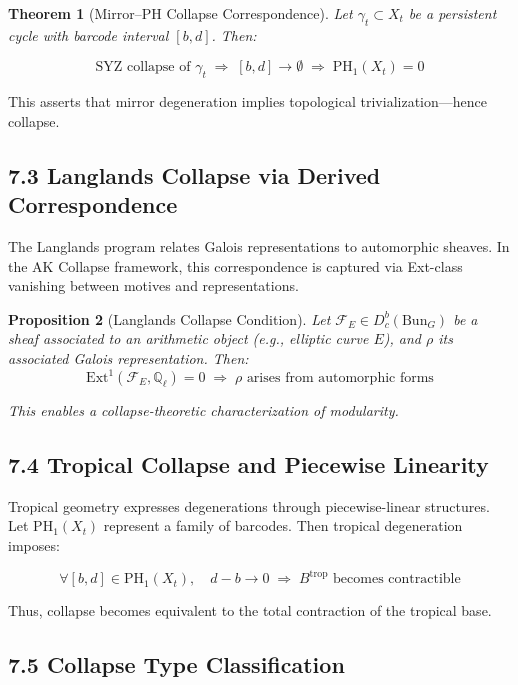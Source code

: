 \documentclass[11pt]{article}
\newtheorem{theorem}{Theorem}[section]
\newtheorem{proposition}[theorem]{Proposition}
\begin{document}
\begin{theorem}[Mirror–PH Collapse Correspondence]
Let \( \gamma_t \subset X_t \) be a persistent cycle with barcode interval \( [b, d] \). Then:

\[
\text{SYZ collapse of } \gamma_t \;\Longrightarrow\; [b,d] \to \emptyset \;\Longrightarrow\; \mathrm{PH}_1(X_t) = 0
\]
\end{theorem}

This asserts that mirror degeneration implies topological trivialization—hence collapse.

\subsection*{7.3 Langlands Collapse via Derived Correspondence}

The Langlands program relates Galois representations to automorphic sheaves.  
In the AK Collapse framework, this correspondence is captured via Ext-class vanishing between motives and representations.

\begin{proposition}[Langlands Collapse Condition]
Let \( \mathcal{F}_E \in D^b_c(\mathrm{Bun}_G) \) be a sheaf associated to an arithmetic object (e.g., elliptic curve \( E \)), and \( \rho \) its associated Galois representation.  
Then:
\[
\mathrm{Ext}^1(\mathcal{F}_E, \mathbb{Q}_\ell) = 0 \;\Longrightarrow\; \rho \text{ arises from automorphic forms}
\]

This enables a collapse-theoretic characterization of modularity.
\end{proposition}

\subsection*{7.4 Tropical Collapse and Piecewise Linearity}

Tropical geometry expresses degenerations through piecewise-linear structures.  
Let \( \mathrm{PH}_1(X_t) \) represent a family of barcodes. Then tropical degeneration imposes:

\[
\forall [b,d] \in \mathrm{PH}_1(X_t), \quad d - b \to 0 \;\Rightarrow\; B^{\mathrm{trop}} \text{ becomes contractible}
\]

Thus, collapse becomes equivalent to the total contraction of the tropical base.

\subsection*{7.5 Collapse Type Classification}
\end{document}
